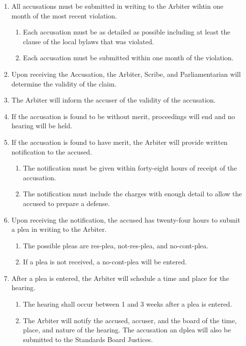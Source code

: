 	\begin{enumerate}
		\item All accusations must be submitted in writing to the Arbiter wihtin one month of the most recent violation.
			\begin{enumerate}
				\item Each accusation must be as detailed as possible including at least the clause of the local bylaws that was violated.
				\item Each accusation must be submitted within one month of the violation.
			\end{enumerate}

		\item Upon receiving the Accusation, the Arbiter, Scribe, and Parliamentarian will determine the validity of the claim.
		\item The Arbiter will inform the accuser of the validity of the accusation.
		\item If the accusation is found to be without merit, proceedings will end and no hearing will be held.
		\item If the accusation is found to have merit, the Arbiter will provide written notification to the accused.
			\begin{enumerate}
				\item The notification must be given within forty-eight hours of receipt of the accusation.
				\item The notification must include the charges with enough detail to allow the accused to prepare a defense.
			\end{enumerate}
		\item Upon receiving the notification, the accused has twenty-four hours to submit a plea in writing to the Arbiter.
			\begin{enumerate}
				\item The possible pleas are \gls{res-plea}, \gls{not-res-plea}, and \gls{no-cont-plea}.
				\item If a plea is not received, a \gls{no-cont-plea} will be entered.
			\end{enumerate}

		\item After a plea is entered, the Arbiter will schedule a time and place for the hearing.
			\begin{enumerate}
				\item The hearing shall occur between 1 and 3 weeks after a plea is entered.
				\item The Arbiter will notify the accused, accuser, and the board of the time, place, and nature of the hearing. The accusation an dplea will also be submitted to the Standards Board Justices.
			\end{enumerate}


\end{enumerate}

